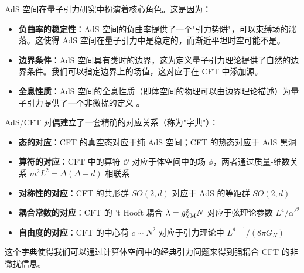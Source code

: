 AdS 空间在量子引力研究中扮演着核心角色。这是因为：
\begin{itemize}
    \item \textbf{负曲率的稳定性}：AdS 空间的负曲率提供了一个"引力势阱"，可以束缚场的涨落。这使得 AdS 空间在量子引力中是稳定的，而渐近平坦时空可能不是。
    \item \textbf{边界条件}：AdS 空间具有类时的边界，这为定义量子引力理论提供了自然的边界条件。我们可以指定边界上的场值，这对应于在 CFT 中添加源。
    \item \textbf{全息性质}：AdS 空间的全息性质（即体空间的物理可以由边界理论描述）为量子引力提供了一个非微扰的定义 \cite{Maldacena1997}。
\end{itemize}

\begin{remark}
AdS/CFT 对偶建立了一套精确的对应关系（称为"字典"）\cite{Maldacena1997}：
\begin{itemize}
    \item \textbf{态的对应}：CFT 的真空态对应于纯 AdS 空间；CFT 的热态对应于 AdS 黑洞 \cite{Hawking1983}
    \item \textbf{算符的对应}：CFT 中的算符 $\mathcal{O}$ 对应于体空间中的场 $\phi$，两者通过质量-维数关系 $m^2 L^2 = \Delta(\Delta-d)$ 相联系
    \item \textbf{对称性的对应}：CFT 的共形群 $SO(2,d)$ 对应于 AdS 的等距群 $SO(2,d)$
    \item \textbf{耦合常数的对应}：CFT 的 't Hooft 耦合 $\lambda = g_{\rm YM}^2 N$ 对应于弦理论参数 $L^4/\alpha'^2$
    \item \textbf{自由度的对应}：CFT 的中心荷 $c \sim N^2$ 对应于引力理论中 $L^{d-1}/(8\pi G_N)$
\end{itemize}
这个字典使得我们可以通过计算体空间中的经典引力问题来得到强耦合 CFT 的非微扰信息。
\end{remark}

